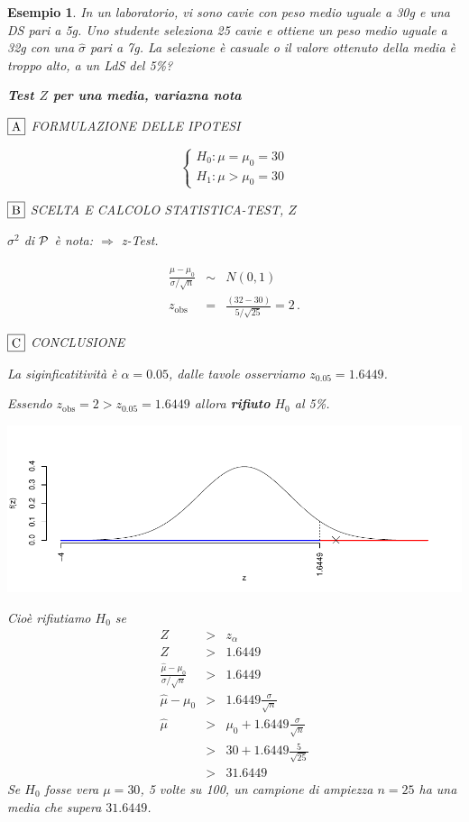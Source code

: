 \documentclass[
  11pt,
]{book}
\theoremstyle{mytheoremstyle}
\theoremstyle{mydefstyle}
\newtheorem{example}{{Esempio}}[section]
\begin{document}
\begin{example}
In un laboratorio, vi sono cavie con peso medio uguale a 30g e una DS
pari a 5g. Uno studente seleziona 25 cavie e ottiene un peso medio
uguale a 32g con una \(\hat\sigma\) pari a 7g. La selezione è casuale o il
valore ottenuto della media è troppo alto, a un LdS del 5\%?

\textbf{Test \(Z\) per una media, variazna nota}

\(\fbox{A}\) FORMULAZIONE DELLE IPOTESI

\[\begin{cases}
   H_0: \mu = \mu_0=30 \\
   H_1: \mu > \mu_0=30 
   \end{cases}\]

\(\fbox{B}\) SCELTA E CALCOLO STATISTICA-TEST, \(Z\)

\(\sigma^{2}\) di \(\cal{P}\) è nota: \(\Rightarrow\) z-Test.

\begin{eqnarray*}
   \frac{\hat\mu - \mu_{0}} {\sigma/\sqrt{n}}&\sim&N(0,1)\\
   z_{\text{obs}}
   &=& \frac{ ( 32 -  30 )} { 5 /\sqrt{ 25 }}
   =   2 \, .
   \end{eqnarray*}

\(\fbox{C}\) CONCLUSIONE

La siginficatitività è \(\alpha=0.05\), dalle tavole osserviamo \(z_{0.05}=1.6449\).

Essendo \(z_\text{obs}=2>z_{0.05}=1.6449\) allora \textbf{rifiuto} \(H_0\) al 5\%.

\begin{center}\includegraphics{Appunti_di_Statistica_2025_files/figure-latex/15-test-mu-pi-1-1} \end{center}

Cioè rifiutiamo \(H_0\) se
\begin{eqnarray*}
Z &>& z_\alpha \\
Z &>& 1.6449 \\
   \frac{\hat\mu - \mu_{0}} {\sigma/\sqrt{n}}&>&1.6449 \\
   \hat\mu - \mu_{0} &>&1.6449\frac\sigma{\sqrt{n}} \\
   \hat\mu &>& \mu_{0} + 1.6449\frac\sigma{\sqrt{n}} \\   
   &>&   30 + 1.6449\frac 5{ \sqrt{ 25 }}\\
   &>&   31.6449
   \end{eqnarray*}
Se \(H_0\) fosse vera \(\mu=30\), 5 volte su 100, un campione di ampiezza \(n=25\)
ha una media che supera \(31.6449\).
\end{example}
\end{document}
